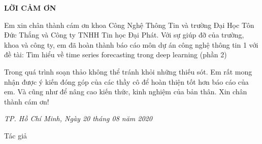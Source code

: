 \newpage	
\vspace{5cm} 

\begin{center}
	{
		\fontsize{16pt}{1}\selectfont
		\textbf{LỜI CẢM ƠN}
	}
\end{center} 		

\vspace{0.5cm}
Em xin chân thành cám ơn khoa Công Nghệ Thông Tin và trường Đại Học Tôn Đức Thắng và Công ty TNHH Tin học Đại Phát. Với sự giúp đỡ của trường, khoa và công ty, em đã hoàn thành báo cáo môn dự án công nghệ thông tin 1 với đề tài: Tìm hiểu về time series forecasting trong deep learning (phần 2)

Trong quá trình soạn thảo không thể tránh khỏi những thiếu sót. Em rất mong nhận được ý kiến đóng góp của các thầy cô để hoàn thiện tốt hơn báo cáo của em. Và cũng như để nâng cao kiến thức, kinh
nghiệm của bản thân. Xin chân thành cám ơn!
	

\begin{flushright}
	{\it TP. Hồ Chí Minh, Ngày 20 tháng 08 năm 2020 }
	
	Tác giả \hskip 2.5cm\quad
	
\end{flushright}
